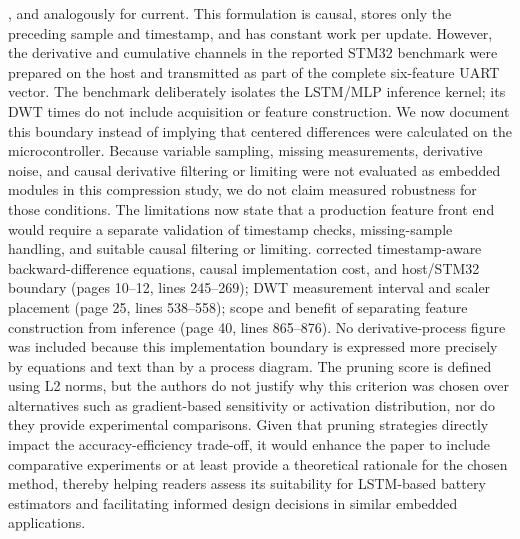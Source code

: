 {}, and analogously for current.\markdownRendererParagraphSeparator
{}This formulation is causal, stores only the preceding sample and timestamp, and has constant work per update. However, the derivative and cumulative channels in the reported STM32 benchmark were prepared on the host and transmitted as part of the complete six-feature UART vector. The benchmark deliberately isolates the LSTM/MLP inference kernel; its DWT times do not include acquisition or feature construction. We now document this boundary instead of implying that centered differences were calculated on the microcontroller.\markdownRendererParagraphSeparator
{}Because variable sampling, missing measurements, derivative noise, and causal derivative filtering or limiting were not evaluated as embedded modules in this compression study, we do not claim measured robustness for those conditions. The limitations now state that a production feature front end would require a separate validation of timestamp checks, missing-sample handling, and suitable causal filtering or limiting.\markdownRendererParagraphSeparator
{} corrected timestamp-aware backward-difference equations, causal implementation cost, and host/STM32 boundary (pages 10--12, lines 245--269); DWT measurement interval and scaler placement (page 25, lines 538--558); scope and benefit of separating feature construction from inference (page 40, lines 865--876). No derivative-process figure was included because this implementation boundary is expressed more precisely by equations and text than by a process diagram.\markdownRendererInterblockSeparator
{}
\markdownRendererSectionEnd \markdownRendererSectionBegin
{}\markdownRendererInterblockSeparator
{}\markdownRendererBlockQuoteBegin
The pruning score is defined using L2 norms, but the authors do not justify why this criterion was chosen over alternatives such as gradient-based sensitivity or activation distribution, nor do they provide experimental comparisons. Given that pruning strategies directly impact the accuracy-efficiency trade-off, it would enhance the paper to include comparative experiments or at least provide a theoretical rationale for the chosen method, thereby helping readers assess its suitability for LSTM-based battery estimators and facilitating informed design decisions in similar embedded applications.\markdownRendererBlockQuoteEnd \markdownRendererInterblockSeparator
